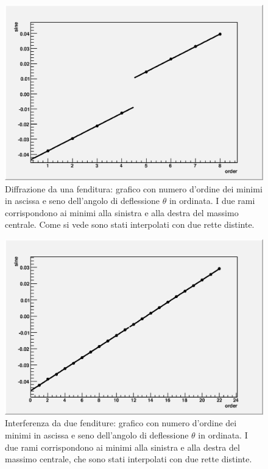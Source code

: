 \documentclass[italian,a4paper]{article}
\begin{document}
\begin{figure}[!h]\centering
\includegraphics[scale=.6]{1slit.outsin.eps}
\caption{Diffrazione da una fenditura: grafico con numero d'ordine dei minimi in ascissa e seno dell'angolo di deflessione $\theta$ in ordinata. I due rami corrispondono ai minimi alla sinistra e alla destra del massimo centrale. Come si vede sono stati interpolati con due rette distinte.}\label{1slitsin}
\end{figure}
\begin{figure}[!h]\centering
\includegraphics[scale=.6]{2slits.outsin.eps}
\caption{Interferenza da due fenditure: grafico con numero d'ordine dei minimi in ascissa e seno dell'angolo di deflessione $\theta$ in ordinata. I due rami corrispondono ai minimi alla sinistra e alla destra del massimo centrale, che sono stati interpolati con due rette distinte.}\label{2slitssin}
\end{figure}
\end{document}
